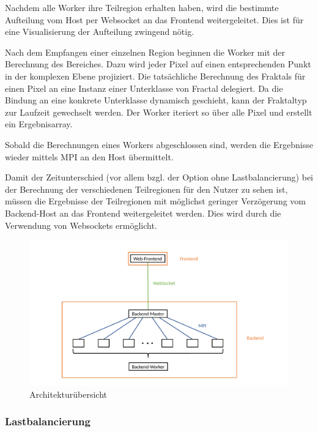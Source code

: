 Nachdem alle Worker ihre Teilregion erhalten haben, wird die bestimmte Aufteilung vom Host per Websocket an das Frontend weitergeleitet. Dies ist für eine Visualisierung der Aufteilung zwingend nötig.

Nach dem Empfangen einer einzelnen Region beginnen die Worker mit der Berechnung des Bereiches. Dazu wird jeder Pixel auf einen entsprechenden Punkt in der komplexen Ebene projiziert. Die tatsächliche Berechnung des Fraktals für einen Pixel an eine Instanz einer Unterklasse von Fractal delegiert. Da die Bindung an eine konkrete Unterklasse dynamisch geschieht, kann der Fraktaltyp zur Laufzeit gewechselt werden. Der Worker iteriert so über alle Pixel und erstellt ein Ergebnisarray.

Sobald die Berechnungen eines Workers abgeschlossen sind, werden die Ergebnisse wieder mittels MPI an den Host übermittelt.

Damit der Zeitunterschied (vor allem bzgl. der Option ohne Lastbalancierung) bei der Berechnung der verschiedenen Teilregionen für den Nutzer zu sehen ist, müssen die Ergebnisse der Teilregionen mit möglichst geringer Verzögerung vom Backend-Host an das Frontend weitergeleitet werden. Dies wird durch die Verwendung von Websockets ermöglicht.

\begin{figure}
    \centering
        \includegraphics[width=0.98\linewidth]{img/Implementierung/Kommunikation.pdf}
        \caption{Architekturübersicht}
    \label{fig:architekturuebersicht}
\end{figure}

\subsubsection{Lastbalancierung}

